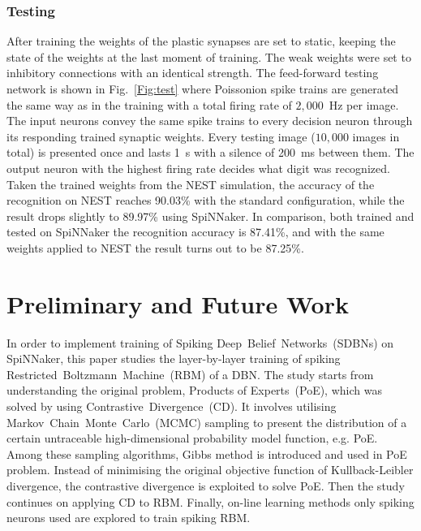 \documentclass[journal]{journal}
\begin{document}
	\subsubsection{Testing}
	After training the weights of the plastic synapses are set to static, keeping the state of the weights at the last moment of training.
	The weak weights were set to inhibitory connections with an identical strength.
	The feed-forward testing network is shown in Fig.~\ref{Fig:test} where Poissonion spike trains are generated the same way as in the training with a total firing rate of $2,000$~Hz per image.
	The input neurons convey the same spike trains to every decision neuron through its responding trained synaptic weights. 
	Every testing image ($10,000$ images in total) is presented once and lasts 1~s with a silence of 200~ms between them.
	The output neuron with the highest firing rate decides what digit was recognized.
	Taken the trained weights from the NEST simulation, the accuracy of the recognition on NEST reaches 90.03\% with the standard configuration, while the result drops slightly to 89.97\% using SpiNNaker.
	In comparison, both trained and tested on SpiNNaker the recognition accuracy is 87.41\%, and with the same weights applied to NEST the result turns out to be 87.25\%.  
\section{Preliminary and Future Work}
	In order to implement training of Spiking Deep~Belief~Networks~(SDBNs) on SpiNNaker, this paper studies the layer-by-layer training of spiking Restricted~Boltzmann~Machine~(RBM) of a DBN.
	The study starts from understanding the original problem, Products of Experts~(PoE), which was solved by using Contrastive~Divergence~(CD).
	It involves utilising Markov~Chain~Monte~Carlo~(MCMC) sampling to present the distribution of a certain untraceable high-dimensional probability model function, e.g. PoE.
	Among these sampling algorithms, Gibbs method is introduced and used in PoE problem.
	Instead of minimising the original objective function of Kullback-Leibler divergence, the contrastive divergence is exploited to solve PoE.
	Then the study continues on applying CD to RBM.
	Finally, on-line learning methods only spiking neurons used are explored to train spiking RBM.
	
\end{document}
